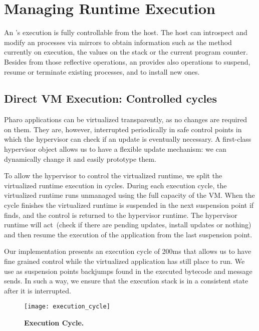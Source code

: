 \section{Managing Runtime Execution} \label{sec:execution}

An \objectspace's execution is fully controllable from the host. The host can introspect and modify an \objectspace processes via mirrors to obtain information such as the method currently on execution, the values on the stack or the current program counter. Besides from those reflective operations, an \objectspace provides also operations to suspend, resume or terminate existing processes, and to install new ones.

\subsection{Direct VM Execution: Controlled cycles}

Pharo applications can be virtualized transparently, as no changes are required on them. They are, however, interrupted periodically in safe control points in which the hypervisor can check if an update is eventually necessary. A first-class hypervisor object allows us to have a flexible update mechanism: we can dynamically change it and easily prototype them.

To allow the hypervisor to control the virtualized runtime, we split the virtualized runtime execution in cycles. During each execution cycle, the virtualized runtime runs unmanaged using the full capacity of the VM. When the cycle finishes the virtualized runtime is suspended in the next suspension point if finds, and the control is returned to the hypervisor runtime. The hypervisor runtime will act~(check if there are pending updates, install updates or nothing) and then resume the execution of the application from the last suspension point.

Our implementation presents an execution cycle of 200ms that allows us to have fine grained control while the virtualized application has still place to run. We use as suspension points backjumps found in the executed bytecode and message sends. In such a way, we ensure that the execution stack is in a consistent state after it is interrupted.

\begin{figure}[ht]
\center
\texttt{[image: execution\_cycle]}
\caption{\textbf{Execution Cycle.} \label{fig:execution_cycle}}
\end{figure}


